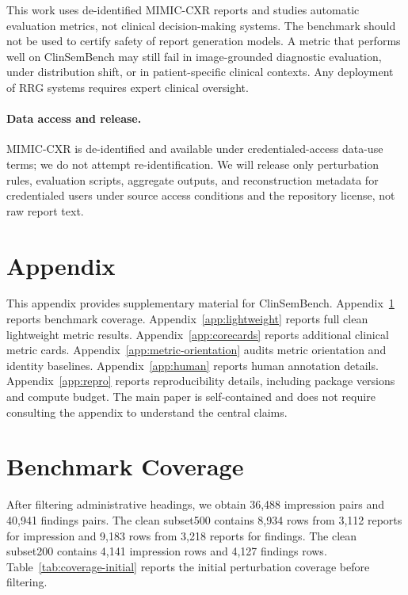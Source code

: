 \documentclass[11pt]{article}
\newcommand{\bench}{ClinSemBench\xspace}
\begin{document}
This work uses de-identified MIMIC-CXR reports and studies automatic evaluation metrics, not clinical decision-making systems. The benchmark should not be used to certify safety of report generation models. A metric that performs well on \bench may still fail in image-grounded diagnostic evaluation, under distribution shift, or in patient-specific clinical contexts. Any deployment of RRG systems requires expert clinical oversight.

\paragraph{Data access and release.}
MIMIC-CXR is de-identified and available under credentialed-access data-use terms; we do not attempt re-identification. We will release only perturbation rules, evaluation scripts, aggregate outputs, and reconstruction metadata for credentialed users under source access conditions and the repository license, not raw report text.


\clearpage



\clearpage
\appendix

\section*{Appendix}

This appendix provides supplementary material for \bench. 
Appendix~\ref{app:coverage} reports benchmark coverage. 
Appendix~\ref{app:lightweight} reports full clean lightweight metric results. 
Appendix~\ref{app:corecards} reports additional clinical metric cards. 
Appendix~\ref{app:metric-orientation} audits metric orientation and identity baselines.
Appendix~\ref{app:human} reports human annotation details. 
Appendix~\ref{app:repro} reports reproducibility details, including package versions and compute budget.
The main paper is self-contained and does not require consulting the appendix to understand the central claims.

\section{Benchmark Coverage}
\label{app:coverage}

After filtering administrative headings, we obtain 36,488 impression pairs and 40,941 findings pairs. 
The clean subset500 contains 8,934 rows from 3,112 reports for impression and 9,183 rows from 3,218 reports for findings. 
The clean subset200 contains 4,141 impression rows and 4,127 findings rows. 
Table~\ref{tab:coverage-initial} reports the initial perturbation coverage before filtering.
\end{document}
